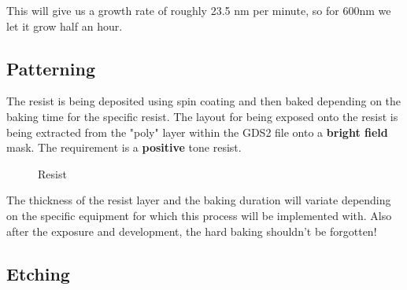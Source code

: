 This will give us a growth rate of roughly 23.5 nm per minute, so for 600nm we let it grow half an hour.

\newpage

\subsection{Patterning}

The resist is being deposited using spin coating and then baked depending on the baking time for the specific resist.
The layout for being exposed onto the resist is being extracted from the "poly" layer within the GDS2 file onto a \textbf{bright field} mask.
The requirement is a \textbf{positive} tone resist.

\begin{figure}[H]
	\centering
	\begin{tikzpicture}[node distance = 3cm, auto, thick,scale=\CrossAndTopSection, every node/.style={transform shape}]
		
	\end{tikzpicture}
	\begin{tikzpicture}[node distance = 3cm, auto, thick,scale=\CrossAndTopSection, every node/.style={transform shape}]
		
	\end{tikzpicture}
	\begin{tikzpicture}[node distance = 3cm, auto, thick,scale=\CrossAndTopSection, every node/.style={transform shape}]
		
	\end{tikzpicture}
	\begin{tikzpicture}[node distance = 3cm, auto, thick,scale=\CrossAndTopSection, every node/.style={transform shape}]
		
	\end{tikzpicture}
	\caption{Resist}
\end{figure}

The thickness of the resist layer and the baking duration will variate depending on the specific equipment for which this process will be implemented with.
Also after the exposure and development, the hard baking shouldn't be forgotten!

\newpage

\subsection{Etching}

